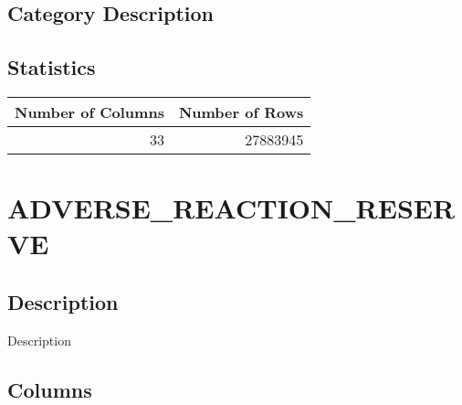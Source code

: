 \documentclass[
  letterpaper,
  DIV=11,
  numbers=noendperiod]{scrreprt}
\begin{document}
\hypertarget{category-description}{%
\section*{Category Description}\label{category-description}}

\hypertarget{statistics}{%
\section*{Statistics}\label{statistics}}

\begin{longtable}{rr}
\toprule
Number of Columns & Number of Rows \\ 
\midrule
33 & 27883945 \\ 
\bottomrule
\end{longtable}

\hypertarget{adverse_reaction_reserve}{%
\chapter*{ADVERSE\_REACTION\_RESERVE}\label{adverse_reaction_reserve}}

\hypertarget{description-1}{%
\section*{Description}\label{description-1}}

Description

\hypertarget{columns-1}{%
\section*{Columns}\label{columns-1}}
\end{document}
